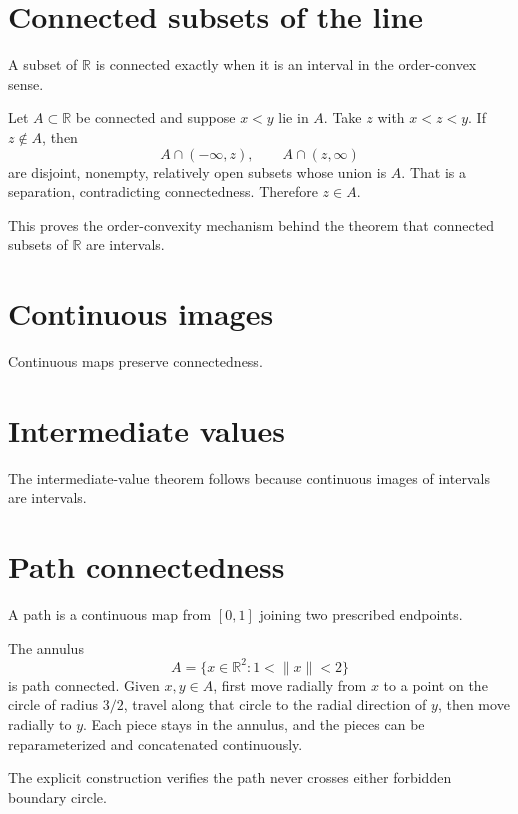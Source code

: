 \section{Connected subsets of the line}
A subset of $\mathbb R$ is connected exactly when it is an interval in the order-convex sense.


\begin{example}\label{ex:ii07-expand-01}
Let \(A\subset\mathbb R\) be connected and suppose \(x<y\) lie in \(A\).
Take \(z\) with \(x<z<y\). If \(z\notin A\), then
\[
A\cap(-\infty,z),\qquad A\cap(z,\infty)
\]
are disjoint, nonempty, relatively open subsets whose union is \(A\). That is
a separation, contradicting connectedness. Therefore \(z\in A\).

This proves the order-convexity mechanism behind the theorem that connected
subsets of \(\mathbb R\) are intervals.
\end{example}
\section{Continuous images}
Continuous maps preserve connectedness.

\section{Intermediate values}
The intermediate-value theorem follows because continuous images of intervals are intervals.

\section{Path connectedness}
A path is a continuous map from $[0,1]$ joining two prescribed endpoints.


\begin{example}\label{ex:ii07-expand-02}
The annulus
\[
A=\{x\in\mathbb R^2:1<\|x\|<2\}
\]
is path connected. Given \(x,y\in A\), first move radially from \(x\) to a
point on the circle of radius \(3/2\), travel along that circle to the radial
direction of \(y\), then move radially to \(y\). Each piece stays in the
annulus, and the pieces can be reparameterized and concatenated continuously.

The explicit construction verifies the path never crosses either forbidden
boundary circle.
\end{example}
